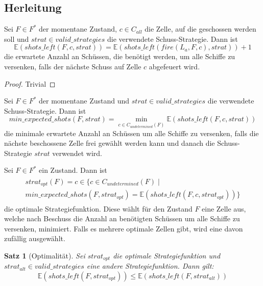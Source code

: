 \documentclass[a4paper,12pt]{llncs}
\numberwithin{equation}{section}
\newtheorem{satz}{Satz}
\begin{document}
\subsection{Herleitung}

\begin{lemma}
Sei $F\in F^*$ der momentane Zustand, $c\in C_{all}$ die Zelle, auf die geschossen werden soll und $strat \in valid\_strategies$ die verwendete Schuss-Strategie.
Dann ist
\[
\mathds{E}(shots\_left(F, c, strat))=\mathds{E}(shots\_left(fire(L_a, F, c), strat)) + 1
\]
die erwartete Anzahl an Schüssen, die benötigt werden, um alle Schiffe zu versenken, falls der nächste Schuss auf Zelle $c$ abgefeuert wird.
\end{lemma}

\begin{proof}
Trivial
\end{proof}

\begin{definition}
Sei $F\in F^*$ der momentane Zustand und $strat \in valid\_strategies$ die verwendete Schuss-Strategie.
Dann ist
\[
min\_expected\_shots(F, strat)=\min_{c \in C_{undetermined}(F)} \mathds{E}(shots\_left(F, c, strat))
\]
die minimale erwartete Anzahl an Schüssen um alle Schiffe zu versenken, falls die nächste beschossene Zelle frei gewählt werden kann und danach die Schuss-Strategie $strat$ verwendet wird.
\end{definition}

\begin{definition}
Sei $F\in F^*$ ein Zustand.
Dann ist
\begin{align}
\begin{split}
strat_{opt}(F)=c \in \{c \in C_{undetermined}(F) \mid \\
min\_expected\_shots(F, strat_{opt})= \mathds{E}(shots\_left(F, c, strat_{opt}))\}
\end{split}
\end{align}
die optimale Strategiefunktion.
Diese wählt für den Zustand $F$ eine Zelle aus, welche nach Beschuss die Anzahl an benötigten Schüssen um alle Schiffe zu versenken, minimiert. Falls es mehrere optimale Zellen gibt, wird eine davon zufällig ausgewählt.
\end{definition}

\begin{satz}[Optimalität]
Sei $strat_{opt}$ die optimale Strategiefunktion und $strat_{alt} \in valid\_strategies$ eine andere Strategiefunktion.
Dann gilt:
\[
\mathds{E}(shots\_left(F, strat_{opt})) \leq \mathds{E}(shots\_left(F, strat_{alt}))
\]
\end{satz}
\end{document}
